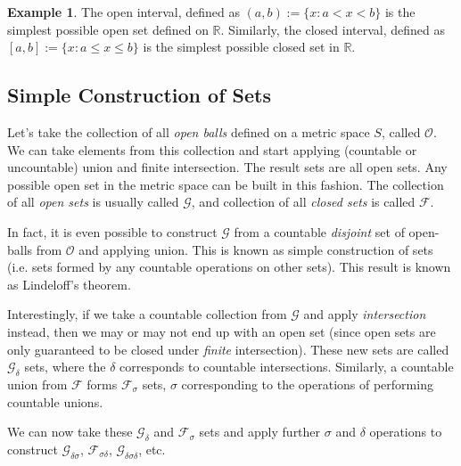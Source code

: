 \documentclass{report}
\theoremstyle{plain}
\theoremstyle{definition}
\newtheorem{example}[theorem]{Example} %
\begin{document}
\begin{example} The open interval, defined as $(a, b):=\{x : a < x < b\}$ is the simplest possible open set defined on $\mathbb{R}$. Similarly, the closed interval, defined as $[a, b]:=\{x : a \leq x \leq b\}$ is the simplest possible closed set in $\mathbb{R}$.
\end{example}
\subsection{Simple Construction of Sets}
Let's take the collection of all \emph{open balls} defined on a metric space $S$, called $\mathcal{O}$. We can take elements from this collection and start applying (countable or uncountable) union and finite intersection. The result sets are all open sets. Any possible open set in the metric space can be built in this fashion. The collection of all \emph{open sets} is usually called $\mathcal{G}$, and collection of all \emph{closed sets} is called $\mathcal{F}$.

In fact, it is even possible to construct $\mathcal{G}$ from a countable \emph{disjoint} set of open-balls from $\mathcal{O}$ and applying union. This is known as simple construction of sets (i.e. sets formed by any countable operations on other sets). This result is known as Lindeloff's theorem.

Interestingly, if we take a countable collection from $\mathcal{G}$ and apply \emph{intersection} instead, then we may or may not end up with an open set (since open sets are only guaranteed to be closed under \emph{finite} intersection). These new sets are called $\mathcal{G}_\delta$ sets, where the $\delta$ corresponds to countable intersections. Similarly, a countable union from $\mathcal{F}$ forms $\mathcal{F}_\sigma$ sets, $\sigma$ corresponding to the operations of performing countable unions.

We can now take these $\mathcal{G}_\delta$ and $\mathcal{F}_\sigma$ sets and apply further $\sigma$ and $\delta$ operations to construct $\mathcal{G}_{\delta\sigma}$, $\mathcal{F}_{\sigma\delta}$, $\mathcal{G}_{\delta\sigma\delta}$, etc.
\end{document}
